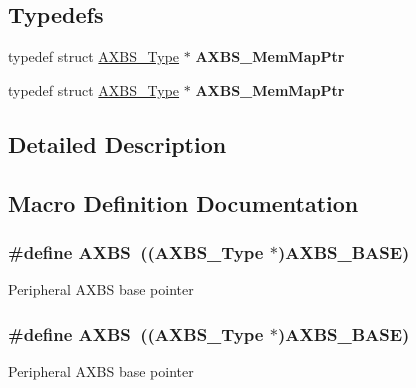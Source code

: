 \subsection*{Typedefs}
\begin{DoxyCompactItemize}
\item 
typedef struct \hyperlink{structAXBS__Type}{A\+X\+B\+S\+\_\+\+Type} $\ast$ {\bfseries A\+X\+B\+S\+\_\+\+Mem\+Map\+Ptr}\hypertarget{group__AXBS__Peripheral__Access__Layer_ga4b830a100cb12dc925051db3d54f58d4}{}\label{group__AXBS__Peripheral__Access__Layer_ga4b830a100cb12dc925051db3d54f58d4}

\item 
typedef struct \hyperlink{structAXBS__Type}{A\+X\+B\+S\+\_\+\+Type} $\ast$ {\bfseries A\+X\+B\+S\+\_\+\+Mem\+Map\+Ptr}\hypertarget{group__AXBS__Peripheral__Access__Layer_ga4b830a100cb12dc925051db3d54f58d4}{}\label{group__AXBS__Peripheral__Access__Layer_ga4b830a100cb12dc925051db3d54f58d4}

\end{DoxyCompactItemize}


\subsection{Detailed Description}


\subsection{Macro Definition Documentation}
\subsubsection[{\texorpdfstring{A\+X\+BS}{AXBS}}]{\setlength{\rightskip}{0pt plus 5cm}\#define A\+X\+BS~(({\bf A\+X\+B\+S\+\_\+\+Type} $\ast$){\bf A\+X\+B\+S\+\_\+\+B\+A\+SE})}\hypertarget{group__AXBS__Peripheral__Access__Layer_gaa1f873165d665725d94cd2615e37daf5}{}\label{group__AXBS__Peripheral__Access__Layer_gaa1f873165d665725d94cd2615e37daf5}
Peripheral A\+X\+BS base pointer 
\subsubsection[{\texorpdfstring{A\+X\+BS}{AXBS}}]{\setlength{\rightskip}{0pt plus 5cm}\#define A\+X\+BS~(({\bf A\+X\+B\+S\+\_\+\+Type} $\ast$){\bf A\+X\+B\+S\+\_\+\+B\+A\+SE})}\hypertarget{group__AXBS__Peripheral__Access__Layer_gaa1f873165d665725d94cd2615e37daf5}{}\label{group__AXBS__Peripheral__Access__Layer_gaa1f873165d665725d94cd2615e37daf5}
Peripheral A\+X\+BS base pointer 
